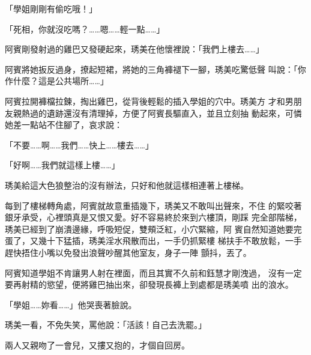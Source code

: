 「學姐剛剛有偷吃哦！」

「死相，你就沒吃嗎？……嗯……輕一點……」

阿賓剛發射過的雞巴又發硬起來，琇美在他懷裡說：「我們上樓去……」

阿賓將她扳反過身，撩起短裙，將她的三角褲褪下一腳，琇美吃驚低聲
叫說：「你作什麼？這是公共場所……」

阿賓拉開褲檔拉鍊，掏出雞巴，從背後輕鬆的插入學姐的穴中。琇美方
才和男朋友親熱過的遺跡還沒有清理掉，方便了阿賓長驅直入，並且立刻抽
動起來，可憐她差一點站不住腳了，哀求說：

「不要……啊……我們……快上……樓去……」

「好啊……我們就這樣上樓……」

琇美給這大色狼整治的沒有辦法，只好和他就這樣相連著上樓梯。

每到了樓梯轉角處，阿賓就故意重插幾下，琇美又不敢叫出聲來，不住
的緊咬著銀牙承受，心裡頭真是又恨又愛。好不容易終於來到六樓頂，剛踩
完全部階梯，琇美已經到了崩潰邊緣，呼吸短促，雙頰泛紅，小穴緊縮，阿
賓自然知道她要完蛋了，又幾十下猛插，琇美淫水飛散而出，一手仍抓緊樓
梯扶手不敢放鬆，一手趕快捂住小嘴以免發出浪聲吵醒其他室友，身子一陣
顫抖，丟了。

阿賓知道學姐不肯讓男人射在裡面，而且其實不久前和鈺慧才剛洩過，
沒有一定要再射精的慾望，便將雞巴抽出來，卻發現長褲上到處都是琇美噴
出的浪水。

「學姐……妳看……」他哭喪著臉說。

琇美一看，不免失笑，罵他說：「活該！自己去洗罷。」

兩人又親吻了一會兒，又摟又抱的，才個自回房。










